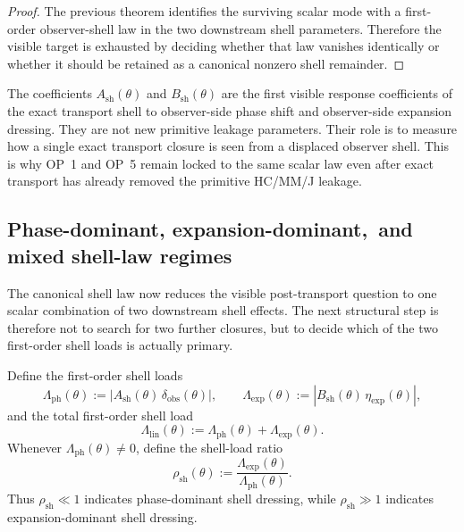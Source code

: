 \begin{proof}
The previous theorem identifies the surviving scalar mode with a first-order observer-shell law in the two downstream shell parameters. Therefore the visible target is exhausted by deciding whether that law vanishes identically or whether it should be retained as a canonical nonzero shell remainder.
\end{proof}

\begin{remark}
The coefficients $A_{\mathrm{sh}}(\theta)$ and $B_{\mathrm{sh}}(\theta)$ are the first visible response coefficients of the exact transport shell to observer-side phase shift and observer-side expansion dressing. They are not new primitive leakage parameters. Their role is to measure how a single exact transport closure is seen from a displaced observer shell. This is why OP~1 and OP~5 remain locked to the same scalar law even after exact transport has already removed the primitive HC/MM/J leakage.
\end{remark}


\subsection*{Phase-dominant, expansion-dominant,\ and mixed shell-law regimes}
The canonical shell law now reduces the visible post-transport question to one scalar combination of two downstream shell effects. The next structural step is therefore not to search for two further closures, but to decide which of the two first-order shell loads is actually primary.

\begin{definition}
Define the first-order shell loads
\[
  \Lambda_{\mathrm{ph}}(\theta):=|A_{\mathrm{sh}}(\theta)\,\delta_{\mathrm{obs}}(\theta)|,
  \qquad
  \Lambda_{\mathrm{exp}}(\theta):=|B_{\mathrm{sh}}(\theta)\,\eta_{\mathrm{exp}}(\theta)|,
\]
and the total first-order shell load
\[
  \Lambda_{\mathrm{lin}}(\theta):=\Lambda_{\mathrm{ph}}(\theta)+\Lambda_{\mathrm{exp}}(\theta).
\]
Whenever $\Lambda_{\mathrm{ph}}(\theta)\neq 0$, define the shell-load ratio
\[
  \rho_{\mathrm{sh}}(\theta):=\frac{\Lambda_{\mathrm{exp}}(\theta)}{\Lambda_{\mathrm{ph}}(\theta)}.
\]
Thus $\rho_{\mathrm{sh}}\ll 1$ indicates phase-dominant shell dressing, while $\rho_{\mathrm{sh}}\gg 1$ indicates expansion-dominant shell dressing.
\end{definition}

